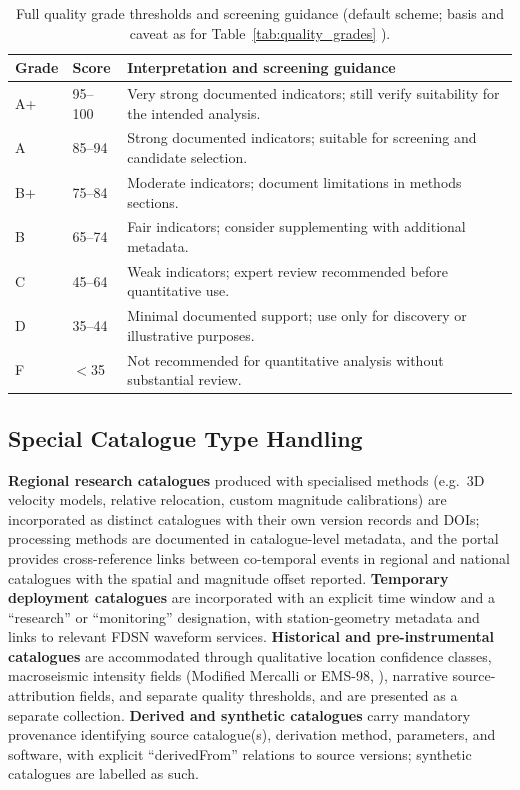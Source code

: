 \documentclass[11pt]{article}
\begin{document}
\begin{table}[H]
\centering
\small
\caption{Full quality grade thresholds and screening guidance (default scheme; basis and caveat as for Table~\ref{tab:quality_grades} \citep{Woessner2005, Bondar2004, WarrenSmith2025}).}
\label{tab:quality_grades_full}
\setlength{\tabcolsep}{5pt}
\renewcommand{\arraystretch}{1.15}
\begin{tabular}{p{1.5cm} p{2cm} p{8.5cm}}
\toprule
\textbf{Grade} & \textbf{Score} & \textbf{Interpretation and screening guidance} \\
\midrule
A+ & 95--100 & Very strong documented indicators; still verify suitability for the intended analysis. \\
A  & 85--94  & Strong documented indicators; suitable for screening and candidate selection. \\
B+ & 75--84  & Moderate indicators; document limitations in methods sections. \\
B  & 65--74  & Fair indicators; consider supplementing with additional metadata. \\
C  & 45--64  & Weak indicators; expert review recommended before quantitative use. \\
D  & 35--44  & Minimal documented support; use only for discovery or illustrative purposes. \\
F  & $<$35   & Not recommended for quantitative analysis without substantial review. \\
\bottomrule
\end{tabular}
\end{table}

\subsection{Special Catalogue Type Handling}
\textbf{Regional research catalogues} produced with specialised methods (e.g.\ 3D velocity models, relative relocation, custom magnitude calibrations) are incorporated as distinct catalogues with their own version records and DOIs; processing methods are documented in catalogue-level metadata, and the portal provides cross-reference links between co-temporal events in regional and national catalogues with the spatial and magnitude offset reported. \textbf{Temporary deployment catalogues} are incorporated with an explicit time window and a ``research'' or ``monitoring'' designation, with station-geometry metadata and links to relevant FDSN waveform services. \textbf{Historical and pre-instrumental catalogues} are accommodated through qualitative location confidence classes, macroseismic intensity fields (Modified Mercalli or EMS-98, \citealp{Grunthal1998}), narrative source-attribution fields, and separate quality thresholds, and are presented as a separate collection. \textbf{Derived and synthetic catalogues} carry mandatory provenance identifying source catalogue(s), derivation method, parameters, and software, with explicit ``derivedFrom'' relations to source versions; synthetic catalogues are labelled as such.
\end{document}
